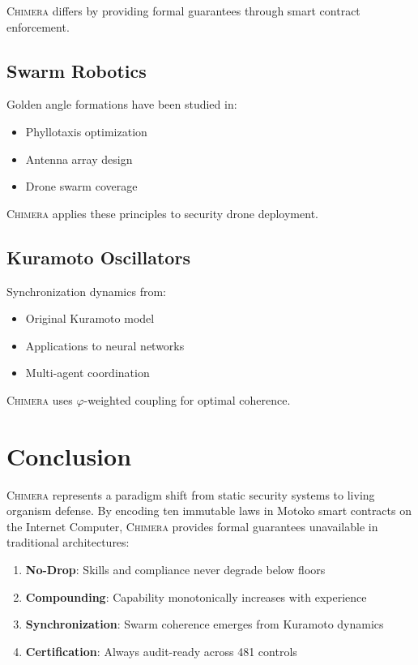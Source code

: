 \documentclass[12pt]{article}
\newcommand{\PHI}{\varphi}
\newcommand{\CHIMERA}{\textsc{Chimera}}
\begin{document}
\CHIMERA{} differs by providing formal guarantees through smart contract enforcement.

\subsection{Swarm Robotics}

Golden angle formations have been studied in:
\begin{itemize}[nosep]
  \item Phyllotaxis optimization~\cite{Vogel1979}
  \item Antenna array design~\cite{Toso2015}
  \item Drone swarm coverage~\cite{Chung2018}
\end{itemize}

\CHIMERA{} applies these principles to security drone deployment.

\subsection{Kuramoto Oscillators}

Synchronization dynamics from:
\begin{itemize}[nosep]
  \item Original Kuramoto model~\cite{Kuramoto1984}
  \item Applications to neural networks~\cite{Breakspear2010}
  \item Multi-agent coordination~\cite{Olfati2007}
\end{itemize}

\CHIMERA{} uses $\PHI$-weighted coupling for optimal coherence.

\section{Conclusion}
\label{sec:conclusion}

\CHIMERA{} represents a paradigm shift from static security systems to living organism defense. By encoding ten immutable laws in Motoko smart contracts on the Internet Computer, \CHIMERA{} provides formal guarantees unavailable in traditional architectures:

\begin{enumerate}[nosep]
  \item \textbf{No-Drop}: Skills and compliance never degrade below floors
  \item \textbf{Compounding}: Capability monotonically increases with experience
  \item \textbf{Synchronization}: Swarm coherence emerges from Kuramoto dynamics
  \item \textbf{Certification}: Always audit-ready across 481 controls
\end{enumerate}
\end{document}
